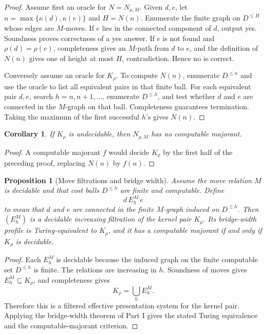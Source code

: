 \documentclass[11pt]{article}
\newtheorem{proposition}[theorem]{Proposition}
\newtheorem{corollary}[theorem]{Corollary}
\begin{document}
\begin{proof}
Assume first an oracle for \(N=N_{\rho,M}\).  Given \(d,e\), let \(n=\max\{\kappa(d),\kappa(e)\}\) and \(H=N(n)\).  Enumerate the finite graph on \(D^{\le H}\) whose edges are \(M\)-moves.  If \(e\) lies in the connected component of \(d\), output yes.  Soundness proves correctness of a yes answer.  If \(e\) is not found and \(\rho(d)=\rho(e)\), completeness gives an \(M\)-path from \(d\) to \(e\), and the definition of \(N(n)\) gives one of height at most \(H\), contradiction.  Hence no is correct.

Conversely assume an oracle for \(K_\rho\).  To compute \(N(n)\), enumerate \(D^{\le n}\) and use the oracle to list all equivalent pairs in that finite ball.  For each equivalent pair \(d,e\), search \(h=n,n+1,\ldots\), enumerate \(D^{\le h}\), and test whether \(d\) and \(e\) are connected in the \(M\)-graph on that ball.  Completeness guarantees termination.  Taking the maximum of the first successful \(h\)'s gives \(N(n)\).
\end{proof}

\begin{corollary}
If \(K_\rho\) is undecidable, then \(N_{\rho,M}\) has no computable majorant.
\end{corollary}

\begin{proof}
A computable majorant \(f\) would decide \(K_\rho\) by the first half of the preceding proof, replacing \(N(n)\) by \(f(n)\).
\end{proof}

\begin{proposition}[Move filtrations and bridge width]
Assume the move relation \(M\) is decidable and that cost balls \(D^{\leq h}\) are finite and computable.  Define
\[
d\,E_h^M\,e
\]
to mean that \(d\) and \(e\) are connected in the finite \(M\)-graph induced on \(D^{\leq h}\).  Then \((E_h^M)\) is a decidable increasing filtration of the kernel pair \(K_\rho\).  Its bridge-width profile is Turing-equivalent to \(K_\rho\), and it has a computable majorant if and only if \(K_\rho\) is decidable.
\end{proposition}

\begin{proof}
Each \(E_h^M\) is decidable because the induced graph on the finite computable set \(D^{\leq h}\) is finite.  The relations are increasing in \(h\).  Soundness of moves gives \(E_h^M\subseteq K_\rho\), and completeness gives
\[
K_\rho=\bigcup_h E_h^M.
\]
Therefore this is a filtered effective presentation system for the kernel pair.  Applying the bridge-width theorem of Part I gives the stated Turing equivalence and the computable-majorant criterion.
\end{proof}
\end{document}
